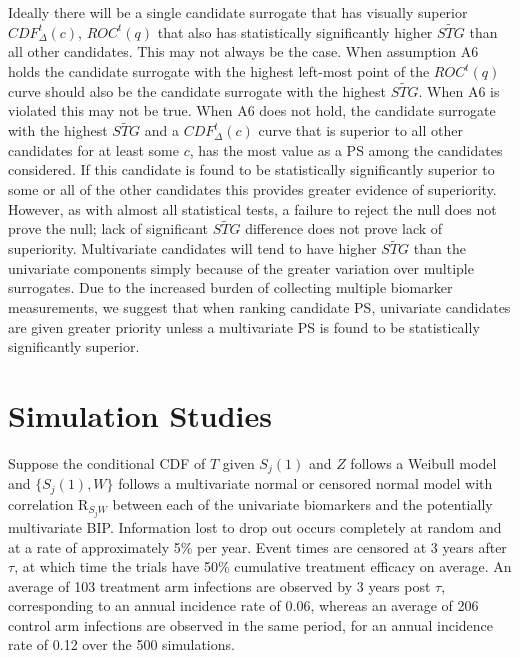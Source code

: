 \documentclass[times, doublespace]{simauth}
\begin{document}
Ideally there will be a single candidate surrogate that has visually superior $CDF^{t}_{\Delta}(c)$, $ROC^{t}(q)$ that also has statistically significantly higher $\widetilde{STG}$ than all other candidates. This may not always be the case. When assumption A6 holds the candidate surrogate with the highest left-most point of the $ROC^{t}(q)$ curve should also be the candidate surrogate with the highest $\widetilde{STG}$. When A6 is violated this may not be true. When A6 does not hold, the candidate surrogate with the highest $\widetilde{STG}$ and a $CDF^{t}_{\Delta}(c)$ curve that is superior to all other candidates for at least some $c$, has the most value as a PS among the candidates considered. If this candidate is found to be statistically significantly superior to some or all of the other candidates this provides greater evidence of superiority. However, as with almost all statistical tests, a failure to reject the null does not prove the null; lack of significant  $\widetilde{STG}$ difference does not prove lack of superiority. Multivariate candidates will tend to have higher $\widetilde{STG}$ than the univariate components simply because of the greater variation over multiple surrogates. Due to the increased burden of collecting multiple biomarker measurements, we suggest that when ranking candidate PS, univariate candidates are given greater priority unless a multivariate PS is found to be statistically significantly superior. 

\section{Simulation Studies}
Suppose the conditional CDF of $T$ given $S_j(1)$ and $Z$ follows a Weibull model and $\{S_j(1),W\}$ follows a multivariate normal or censored normal model with correlation R$_{S_jW}$ between each of the univariate biomarkers and the potentially multivariate BIP. Information lost to drop out occurs completely at random and at a rate of approximately 5\% per year. Event times are censored at 3 years after $\tau$, at which time the trials have 50\% cumulative treatment efficacy on average. An average of 103 treatment arm infections are observed by 3 years post $\tau$, corresponding to an annual incidence rate of 0.06, whereas an average of 206 control arm infections are observed in the same period, for an annual incidence rate of 0.12 over the 500 simulations. 
\end{document}
